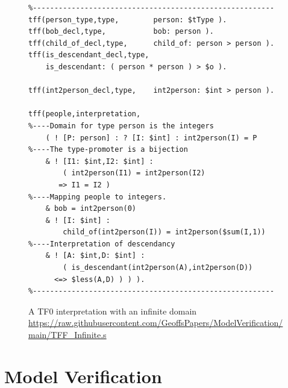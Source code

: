 \documentclass[letterpaper]{article}
\begin{document}
\begin{figure}[tbhp]
\scriptsize
{}
\begin{verbatim}
%--------------------------------------------------------
tff(person_type,type,        person: $tType ).
tff(bob_decl,type,           bob: person ).
tff(child_of_decl,type,      child_of: person > person ).
tff(is_descendant_decl,type, 
    is_descendant: ( person * person ) > $o ).

tff(int2person_decl,type,    int2person: $int > person ).

tff(people,interpretation,
%----Domain for type person is the integers
    ( ! [P: person] : ? [I: $int] : int2person(I) = P
%----The type-promoter is a bijection
    & ! [I1: $int,I2: $int] : 
        ( int2person(I1) = int2person(I2) 
       => I1 = I2 )
%----Mapping people to integers. 
    & bob = int2person(0)
    & ! [I: $int] : 
        child_of(int2person(I)) = int2person($sum(I,1))
%----Interpretation of descendancy
    & ! [A: $int,D: $int] : 
        ( is_descendant(int2person(A),int2person(D)) 
      <=> $less(A,D) ) ) ).
%--------------------------------------------------------
\end{verbatim}
\caption{A TF0 interpretation with an infinite domain\\
{\scriptsize \url{https://raw.githubusercontent.com/GeoffsPapers/ModelVerification/main/TFF_Infinite.s}}}
\label{TF0InfiniteInterpretation}
\end{figure}


\section{Model Verification}
\label{Verification}
\end{document}
